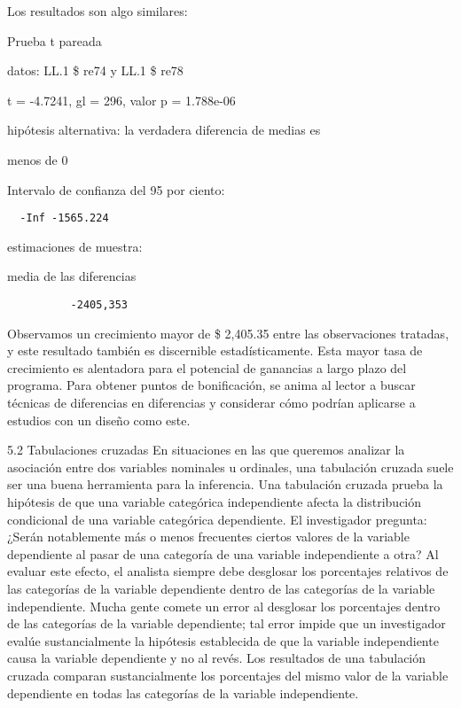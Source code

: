 \documentclass[
]{book}
\begin{document}
Los resultados son algo similares:

Prueba t pareada

datos: LL.1 \$ re74 y LL.1 \$ re78

t = -4.7241, gl = 296, valor p = 1.788e-06

hipótesis alternativa: la verdadera diferencia de medias es

menos de 0

Intervalo de confianza del 95 por ciento:

\begin{verbatim}
  -Inf -1565.224
\end{verbatim}

estimaciones de muestra:

media de las diferencias

\begin{verbatim}
          -2405,353
\end{verbatim}

Observamos un crecimiento mayor de \$ 2,405.35 entre las observaciones tratadas, y este resultado también es discernible estadísticamente. Esta mayor tasa de crecimiento es alentadora para el potencial de ganancias a largo plazo del programa. Para obtener puntos de bonificación, se anima al lector a buscar técnicas de diferencias en diferencias y considerar cómo podrían aplicarse a estudios con un diseño como este.

5.2 Tabulaciones cruzadas
En situaciones en las que queremos analizar la asociación entre dos variables nominales u ordinales, una tabulación cruzada suele ser una buena herramienta para la inferencia. Una tabulación cruzada prueba la hipótesis de que una variable categórica independiente afecta la distribución condicional de una variable categórica dependiente. El investigador pregunta: ¿Serán notablemente más o menos frecuentes ciertos valores de la variable dependiente al pasar de una categoría de una variable independiente a otra? Al evaluar este efecto, el analista siempre debe desglosar los porcentajes relativos de las categorías de la variable dependiente dentro de las categorías de la variable independiente. Mucha gente comete un error al desglosar los porcentajes dentro de las categorías de la variable dependiente; tal error impide que un investigador evalúe sustancialmente la hipótesis establecida de que la variable independiente causa la variable dependiente y no al revés. Los resultados de una tabulación cruzada comparan sustancialmente los porcentajes del mismo valor de la variable dependiente en todas las categorías de la variable independiente.
\end{document}
